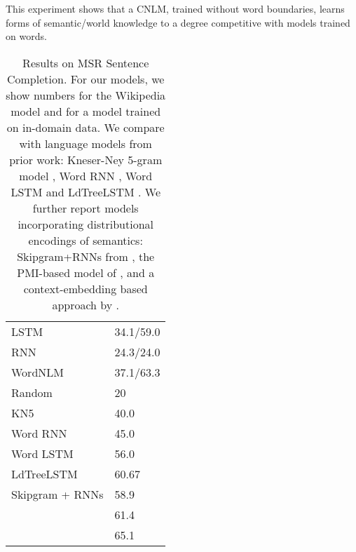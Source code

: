 This experiment shows that a CNLM, trained without word boundaries, learns forms of semantic/world knowledge to a degree competitive with models trained on words.

\begin{table}[t]
  \begin{small}
    \begin{center}
      \begin{tabular}{l|l}
        LSTM 	    &      34.1/59.0 \\ %
        RNN  &     24.3/24.0 \\ %
        WordNLM & 37.1/63.3 \\ \hline \hline %
        Random & 20 \\ \hline
        KN5   & 40.0 \\
        Word RNN & 45.0 \\
        Word LSTM & 56.0 \\ 
        LdTreeLSTM  & 60.67 \\	    \hline
        Skipgram + RNNs  & 58.9 \\
        \citet{woods2016exploiting} &  61.4 \\
        \citet{melamud2016context2vec} & 65.1 \\
      \end{tabular}
    \end{center}
  \end{small}
  \caption{\label{tab:msr-completion-results} Results on MSR Sentence Completion. For our models, we show numbers for the Wikipedia model and for a model trained on in-domain data. We compare with language models from prior work: Kneser-Ney 5-gram model \cite{Mikolov:2012}, Word RNN \cite{zweig2012computational}, Word LSTM and LdTreeLSTM \cite{zhang2016top}. We further report models incorporating distributional encodings of semantics: Skipgram+RNNs from , the PMI-based model of \citet{woods2016exploiting}, and a context-embedding based approach by \citet{melamud2016context2vec}.}
\end{table}



